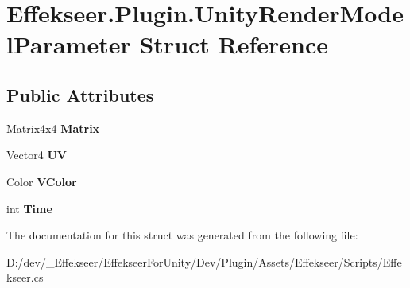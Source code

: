 \hypertarget{struct_effekseer_1_1_plugin_1_1_unity_render_model_parameter}{\section{Effekseer.\-Plugin.\-Unity\-Render\-Model\-Parameter Struct Reference}
\label{struct_effekseer_1_1_plugin_1_1_unity_render_model_parameter}
}
\subsection*{Public Attributes}
\begin{DoxyCompactItemize}
\item 
\hypertarget{struct_effekseer_1_1_plugin_1_1_unity_render_model_parameter_a45188a3e855fd4d34971f9c6bed56399}{Matrix4x4 {\bfseries Matrix}}\label{struct_effekseer_1_1_plugin_1_1_unity_render_model_parameter_a45188a3e855fd4d34971f9c6bed56399}

\item 
\hypertarget{struct_effekseer_1_1_plugin_1_1_unity_render_model_parameter_aa68ed1ffbf112a6dd6bd7be2b9d12a82}{Vector4 {\bfseries U\-V}}\label{struct_effekseer_1_1_plugin_1_1_unity_render_model_parameter_aa68ed1ffbf112a6dd6bd7be2b9d12a82}

\item 
\hypertarget{struct_effekseer_1_1_plugin_1_1_unity_render_model_parameter_ad5f2a367459643e02a7ff51ef3431b05}{Color {\bfseries V\-Color}}\label{struct_effekseer_1_1_plugin_1_1_unity_render_model_parameter_ad5f2a367459643e02a7ff51ef3431b05}

\item 
\hypertarget{struct_effekseer_1_1_plugin_1_1_unity_render_model_parameter_ac330aebed8c988a8a80da910fd0690d2}{int {\bfseries Time}}\label{struct_effekseer_1_1_plugin_1_1_unity_render_model_parameter_ac330aebed8c988a8a80da910fd0690d2}

\end{DoxyCompactItemize}


The documentation for this struct was generated from the following file\-:\begin{DoxyCompactItemize}
\item 
D\-:/dev/\-\_\-\-Effekseer/\-Effekseer\-For\-Unity/\-Dev/\-Plugin/\-Assets/\-Effekseer/\-Scripts/Effekseer.\-cs\end{DoxyCompactItemize}
